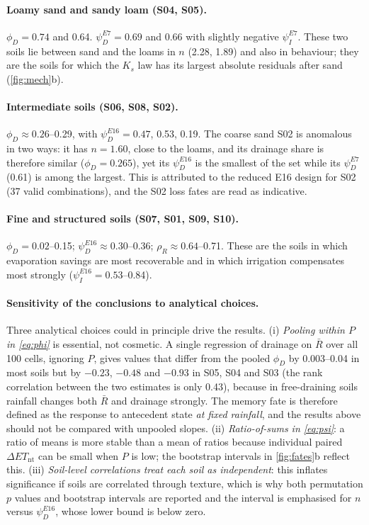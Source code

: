 \documentclass[preprint,12pt,authoryear]{elsarticle}
\newcommand{\Ent}{\mathit{ET}_{\mathrm{nt}}}
\begin{document}
\paragraph{Loamy sand and sandy loam (S04, S05).} $\phi_D=0.74$ and 0.64. $\psi_D^{E7}=0.69$ and 0.66 with slightly negative $\psi_I^{E7}$. These two soils lie between sand and the loams in $n$ (2.28, 1.89) and also in behaviour; they are the soils for which the $K_s$ law has its largest absolute residuals after sand (\cref{fig:mech}b).
\paragraph{Intermediate soils (S06, S08, S02).} $\phi_D\approx0.26$--0.29, with $\psi_D^{E16}=0.47$, 0.53, 0.19. The coarse sand S02 is anomalous in two ways: it has $n=1.60$, close to the loams, and its drainage share is therefore similar ($\phi_D=0.265$), yet its $\psi_D^{E16}$ is the smallest of the set while its $\psi_D^{E7}$ (0.61) is among the largest. This is attributed to the reduced E16 design for S02 (37 valid combinations), and the S02 loss fates are read as indicative.
\paragraph{Fine and structured soils (S07, S01, S09, S10).} $\phi_D=0.02$--0.15; $\psi_D^{E16}\approx0.30$--0.36; $\rho_R\approx0.64$--0.71. These are the soils in which evaporation savings are most recoverable and in which irrigation compensates most strongly ($\psi_I^{E16}=0.53$--0.84).

\paragraph{Sensitivity of the conclusions to analytical choices.}
Three analytical choices could in principle drive the results. (i) \emph{Pooling within $P$ in \cref{eq:phi}} is essential, not cosmetic. A single regression of drainage on $\bar R$ over all 100 cells, ignoring $P$, gives values that differ from the pooled $\phi_D$ by 0.003--0.04 in most soils but by $-0.23$, $-0.48$ and $-0.93$ in S05, S04 and S03 (the rank correlation between the two estimates is only 0.43), because in free-draining soils rainfall changes both $\bar R$ and drainage strongly. The memory fate is therefore defined as the response to antecedent state \emph{at fixed rainfall}, and the results above should not be compared with unpooled slopes. (ii) \emph{Ratio-of-sums in \cref{eq:psi}}: a ratio of means is more stable than a mean of ratios because individual paired $\Delta\Ent$ can be small when $P$ is low; the bootstrap intervals in \cref{fig:fates}b reflect this. (iii) \emph{Soil-level correlations treat each soil as independent}: this inflates significance if soils are correlated through texture, which is why both permutation $p$ values and bootstrap intervals are reported and the interval is emphasised for $n$ versus $\psi_D^{E16}$, whose lower bound is below zero.
\end{document}
